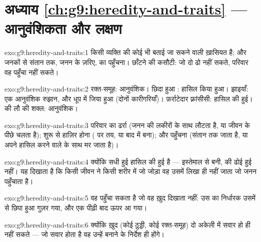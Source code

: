 \section*{अध्याय \ref{ch:g9:heredity-and-traits} --- आनुवंशिकता और लक्षण}

\begin{solution}{exo:g9:heredity-and-traits:1}
 किसी व्यक्ति की कोई भी बताई जा सकने वाली ख़ासियत है; और 
जनकों से संतान तक, जनन के ज़रिए,  का पहुँचना। छाँटने की कसौटी: जो
दो  ढो नहीं सकते, परिवार वह पहुँचा नहीं सकते।
\end{solution}

\begin{solution}{exo:g9:heredity-and-traits:2}
रक्त-समूह: आनुवंशिक। छिदा हुआ : हासिल किया हुआ। झाइयाँ: एक आनुवंशिक
रुझान, और धूप में जिया हुआ (दोनों कारीगरियाँ)। फ़र्राटेदार फ़्रांसीसी: हासिल
की हुई।  की लौ की शक्ल: आनुवंशिक।
\end{solution}

\begin{solution}{exo:g9:heredity-and-traits:3}
परिवार का ढर्रा (जनन की लकीरों के साथ लौटता है, या जीवन के पीछे चलता
है); शुरू से हाज़िर होना ( पर तय, या बाद में बना); और पहुँचना
(संतान तक जाता है, या अपने हासिल करने वाले के साथ मर जाता है)।
\end{solution}

\begin{solution}{exo:g9:heredity-and-traits:4}
क्योंकि सधी हुई  हासिल की हुई है --- इस्तेमाल से बनी,  की
ढोई हुई नहीं। यह दिखाता है कि किसी जीवन ने किसी शरीर में जो जोड़ा वह उसमें
लिखा ही नहीं जाता जो जनन पहुँचाता है।
\end{solution}

\begin{solution}{exo:g9:heredity-and-traits:5}
वह पहुँचा सकता है जो वह ख़ुद दिखाता नहीं: उस  का निर्धारक उसमें से
छिपा हुआ गुज़र गया, और एक पीढ़ी बाद ऊपर आ गया।
\end{solution}

\begin{solution}{exo:g9:heredity-and-traits:6}
क्योंकि ख़ुद  (कोई ठुड्डी, कोई रक्त-समूह) दो अकेली  में सवार
हो ही नहीं सकते --- जो सवार होता है वह उन्हें बनाने के निर्देश ही होंगे।
\end{solution}

